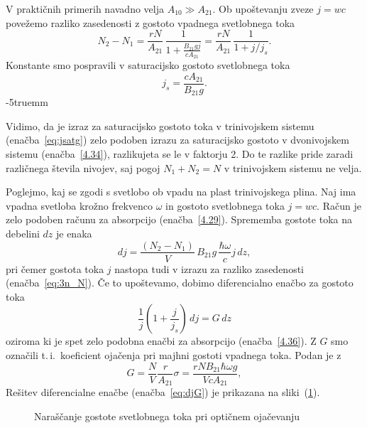 V praktičnih primerih navadno velja $A_{10}\gg A_{21}$. Ob upoštevanju zveze $j=wc$ povežemo
razliko zasedenosti z gostoto vpadnega svetlobnega toka
\begin{equation}
N_{2}-N_{1}=\frac{rN}{A_{21}} \, \frac{1}{1+\frac{B_{21}gj}{c A_{21}}} = 
\frac{rN}{A_{21}} \, \frac{1}{1+j/j_s}.
\label{eq:3n_N}
\end{equation}
Konstante smo pospravili v saturacijsko gostoto svetlobnega toka 
\begin{equation}
j_s = \frac{c A_{21}}{B_{21}g}.
\label{eq:jsatg}
\end{equation}
\vglue-5truemm
\begin{remark}
 Vidimo, da je  izraz za saturacijsko gostoto toka v trinivojskem sistemu 
 (enačba~\ref{eq:jsatg}) zelo podoben izrazu za saturacijsko gostoto v dvonivojskem
 sistemu (enačba~\ref{4.34}), razlikujeta se le
v faktorju 2. Do te razlike pride zaradi različnega števila nivojev, saj pogoj $N_{1}+N_{2}=N$
v trinivojskem sistemu ne velja. 
\end{remark}
Poglejmo, kaj se zgodi s svetlobo ob vpadu na plast trinivojskega plina. Naj ima vpadna
svetloba krožno frekvenco $\omega$ in gostoto svetlobnega toka $j=wc$. Račun je zelo podoben 
računu za absorpcijo (enačba~\ref{4.29}). Sprememba gostote toka na debelini $dz$ je enaka
\begin{equation}
dj=\frac{(N_{2}-N_{1})}{V}\, B_{21}g\, \frac{\hbar\omega}{c}j\, dz,
\label{eq:dj}
\end{equation}
pri čemer gostota toka $j$ nastopa tudi v izrazu za razliko
zasedenosti (enačba~\ref{eq:3n_N}). Če to upoštevamo, 
dobimo diferencialno enačbo za gostoto toka
\begin{equation}
\frac{1}{j}\left(1+\frac{j}{j_{s}}\right)\, dj=G\, dz
\label{4.43}
\end{equation}
oziroma
ki je spet zelo podobna enačbi za absorpcijo (enačba~\ref{4.36}).
Z $G$ smo označili t.\,i.\, koeficient ojačenja pri majhni gostoti vpadnega
toka. Podan je z 
\begin{equation}
G=\frac{N}{V}\frac{r}{A_{21}}\sigma=\frac{rNB_{21}\hbar\omega g}{VcA_{21}},
\label{4.44}
\end{equation}
Rešitev diferencialne enačbe (enačba~\ref{eq:djG}) je prikazana na sliki~(\ref{fig:ojacanje}). 
\begin{figure}[h]
\centering
\def\svgwidth{80truemm} 

\caption{Naraščanje gostote svetlobnega toka pri optičnem ojačevanju}
\label{fig:ojacanje}
\end{figure}

